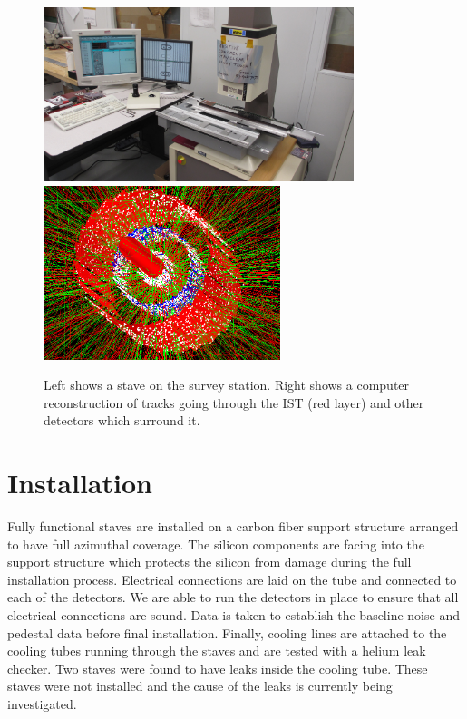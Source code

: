 \documentclass[preprint,12pt]{elsarticle}
\begin{document}
\begin{figure}
\begin{center}
\includegraphics[height=2in, keepaspectratio=true, angle=0]{graphics/survey.jpg}
\includegraphics[height=2in, keepaspectratio=true, angle=0]{graphics/event.png}
\caption{Left shows a stave on the survey station.  Right shows a computer
reconstruction of tracks going through the IST (red layer) and other detectors which
surround it.
\label{fig:survey}}
\end{center}
\end{figure}

\section{Installation}
Fully functional staves are installed on a carbon fiber support structure
arranged to have full azimuthal coverage. The silicon components are facing
into the support structure which protects the silicon from damage during the
full installation process. Electrical connections are laid on the tube and
connected to each of the detectors. We are able to run the detectors in place
to ensure that all electrical connections are sound. Data is taken to establish
the baseline noise and pedestal data before final installation. Finally, cooling
lines are attached to the cooling tubes running through the staves and are
tested with a helium leak checker. Two staves were found to have leaks inside
the cooling tube. These staves were not installed and the cause of the leaks is
currently being investigated.
\end{document}
